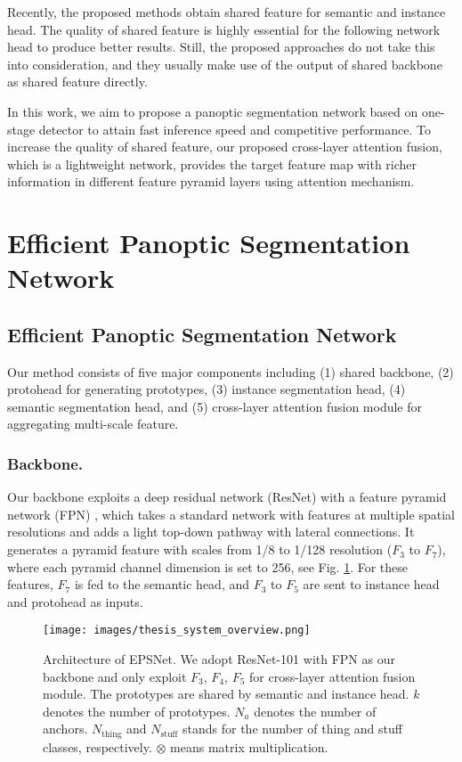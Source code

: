 \documentclass[runningheads]{llncs}
\begin{document}
Recently, the proposed methods obtain shared feature for semantic and instance head. The quality of shared feature is highly essential for the following network head to produce better results. Still, the proposed approaches do not take this into consideration, and they usually make use of the output of shared backbone as shared feature directly. 

In this work, we aim to propose a panoptic segmentation network based on one-stage detector to attain fast inference speed and competitive performance. To increase the quality of shared feature, our proposed cross-layer attention fusion, which is a lightweight network, provides the target feature map with richer information in different feature pyramid layers using attention mechanism.


\section{Efficient Panoptic Segmentation Network}
\subsection{Efficient Panoptic Segmentation Network}
Our method consists of five major components including (1) shared backbone, (2) protohead for generating prototypes, (3) instance segmentation head, (4) semantic segmentation head, and (5) cross-layer attention fusion module for aggregating multi-scale feature.

\subsubsection{Backbone.}  
Our backbone exploits a deep residual network (ResNet) \cite{He2016} with a feature pyramid network (FPN) \cite{Lin2017}, which takes a standard network with features at multiple spatial resolutions and adds a light top-down pathway with lateral connections. It generates a pyramid feature with scales from 1/8 to 1/128 resolution ($F_3$ to $F_7$), where each pyramid channel dimension is set to 256, see Fig. \ref{fig:overview}. For these features, $F_7$ is fed to the semantic head, and $F_3$ to $F_5$ are sent to instance head and protohead as inputs. 



\begin{figure}[tbh]
\centering
\texttt{[image: images/thesis\_system\_overview.png]}
\caption{Architecture of EPSNet. We adopt ResNet-101 \cite{He2016} with FPN \cite{Lin2017} as our backbone and only exploit $F_3$, $F_4$, $F_5$ for cross-layer attention fusion module. The prototypes are shared by semantic and instance head. $k$ denotes the number of prototypes. $N_a$ denotes the number of anchors. $N_{\text{thing}}$ and $N_{\text{stuff}}$ stands for the number of thing and stuff classes, respectively. $\otimes$ means matrix multiplication. }
\label{fig:overview}
\end{figure}
\end{document}
